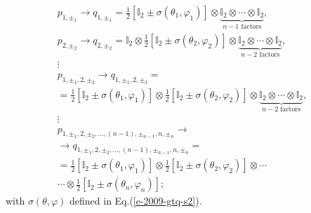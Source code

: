 \documentclass[%
  twocolumn,
 showpacs,
 showkeys,
 preprintnumbers,
 amsmath,amssymb,
 aps,
  pra,
  longbibliography,
 floatfix,
 ]{revtex4-1}
\begin{document}
\begin{equation}
\begin{split}
p_{1,\pm_1 }  \rightarrow  q_{1,\pm_1 }
=
{\frac{1}{2}}\left[{\mathbb I}_2 \pm {\sigma}( \theta_1,\varphi_1 )\right] \otimes
\underbrace{\mathbb{I}_2\otimes  \cdots \otimes  \mathbb{I}_2}_{\text{$n-1$ factors}},
\\
p_{2,\pm_2 }  \rightarrow  q_{2,\pm_2 }
 =
\mathbb{I}_2 \otimes  {\frac{1}{2}}\left[{\mathbb I}_2 \pm {\sigma}( \theta_2,\varphi_2 )\right] \otimes
\underbrace{\mathbb{I}_2\otimes  \cdots \otimes  \mathbb{I}_2}_{\text{$n-2$ factors}},
\\
\vdots
\\
p_{1, \pm_1 ,2, \pm_2 } \rightarrow  q_{1, \pm_1 ,2, \pm_2 }
=  \\=
{\frac{1}{2}}\left[{\mathbb I}_2 \pm {\sigma}( \theta_1,\varphi_1 )\right]
\otimes
{\frac{1}{2}}\left[{\mathbb I}_2 \pm {\sigma}( \theta_2,\varphi_2 )\right] \otimes
\underbrace{\mathbb{I}_2\otimes  \cdots \otimes  \mathbb{I}_2}_{\text{$n-2$ factors}},
\\
\vdots
\\
p_{1,\pm_1 ,2,\pm_2 ,\ldots, (n-1),\pm_{n-1} ,n,\pm_n } \rightarrow
\\ \rightarrow  q_{1,\pm_1 ,2,\pm_2 ,\ldots, (n-1),\pm_{n-1} ,n,\pm_n }
= \\
=
{\frac{1}{2}}\left[{\mathbb I}_2 \pm {\sigma}( \theta_{1},\varphi_{1} )\right]
\otimes
{\frac{1}{2}}\left[{\mathbb I}_2 \pm {\sigma}( \theta_{2},\varphi_{2} )\right]
\otimes
\cdots
\\
\cdots  \otimes
{\frac{1}{2}}\left[{\mathbb I}_2 \pm {\sigma}( \theta_n,\varphi_n )\right];
\end{split}
\label{2017-qbounds-e2}
\end{equation}
with $\sigma ( \theta ,\varphi  )$
defined in Eq.(\ref{e-2009-gtq-s2}).
\end{document}
